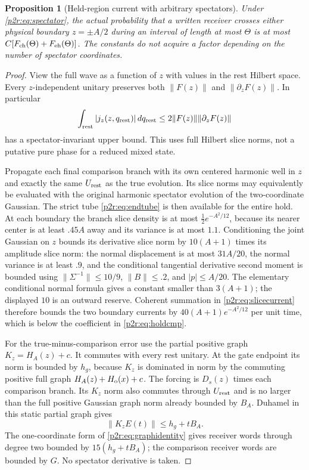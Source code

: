 \documentclass[11pt]{article}
\numberwithin{equation}{section}
\newtheorem{proposition}[theorem]{Proposition}
\theoremstyle{definition}
\theoremstyle{remark}
\begin{document}
\begin{proposition}[Held-region current with arbitrary spectators]
\label{p2r:prop:hold}
Under \eqref{p2r:eq:spectator}, the actual probability that a written
receiver crosses either physical boundary $z=\pm A/2$ during an
interval of length at most $\Theta$ is at most
$C[F_{\rm ch}(\Theta)+F_{\rm eh}(\Theta)]$.
The constants do not acquire a factor depending on the number of
spectator coordinates.
\end{proposition}
\begin{proof}
View the full wave as a function of $z$ with values in the rest
Hilbert space. Every $z$-independent unitary preserves both
$\|F(z)\|$ and $\|\partial_zF(z)\|$. In particular
\begin{equation}\label{p2r:eq:slicecurrent}
 \int_{\rm rest}|j_z(z,q_{\rm rest})|\,dq_{\rm rest}
       \leq2\|F(z)\|\|\partial_zF(z)\|
\end{equation}
has a spectator-invariant upper bound.
This uses full Hilbert slice norms, not a putative pure phase
for a reduced mixed state.

Propagate each final comparison branch with its own centered
harmonic well in $z$ and exactly the same $U_{\rm rest}$ as the
true evolution. Its slice norms may equivalently be evaluated
with the original harmonic spectator evolution of the
two-coordinate Gaussian. The strict tube
\eqref{p2r:eq:endtube} is then available for the entire hold.
At each boundary the branch slice density is at most
$\frac12e^{-A^2/12}$, because its nearer center is at least
$.45A$ away and its variance is at most $1.1$.
Conditioning the joint Gaussian on $z$ bounds its derivative
slice norm by $10(A+1)$ times its amplitude slice norm:
the normal displacement is at most $31A/20$,
the normal variance is at least $.9$, and the conditional
tangential derivative second moment is bounded using
$\|\Sigma^{-1}\|\leq10/9$, $\|B\|\leq.2$, and $|p|\leq A/20$.
The elementary conditional normal formula gives a constant
smaller than $3(A+1)$; the displayed $10$ is an outward reserve.
Coherent summation in \eqref{p2r:eq:slicecurrent} therefore bounds
the two boundary currents by $40(A+1)e^{-A^2/12}$ per unit time,
which is below the coefficient in \eqref{p2r:eq:holdcmp}.

For the true-minus-comparison error use the partial positive
graph $K_z=H_A(z)+c$. It commutes with every rest unitary.
At the gate endpoint its norm is bounded by $h_g$, because
$K_z$ is dominated in norm by the commuting positive full
graph $H_A(z)+H_{\rm o}(x)+c$.
The forcing is $D_s(z)$ times each comparison branch.
Its $K_z$ norm also commutes through $U_{\rm rest}$ and is no
larger than the full positive Gaussian graph norm already
bounded by $B_A$. Duhamel in this static partial graph gives
\[
 \|K_zE(t)\|\leq h_g+tB_A.
\]
The one-coordinate form of \eqref{p2r:eq:graphidentity} gives
receiver words through degree two bounded by $15(h_g+tB_A)$;
the comparison receiver words are bounded by $G$.
No spectator derivative is taken.


\end{proof}
\end{document}
